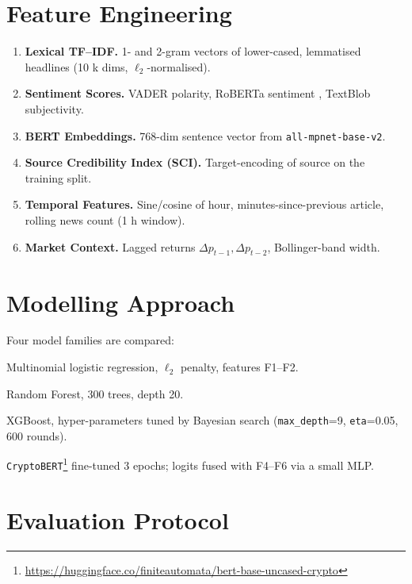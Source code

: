 \documentclass[12pt,a4paper]{article}
\begin{document}
\section{Feature Engineering}\label{sec:features}
\begin{enumerate}[label=\textbf{F\arabic*}.]
\item \textbf{Lexical TF–IDF.} 1- and 2-gram vectors of lower-cased,
      lemmatised headlines (10 k dims, $\ell_2$-normalised).
\item \textbf{Sentiment Scores.} VADER polarity, RoBERTa
      sentiment \cite{roberta}, TextBlob subjectivity.
\item \textbf{BERT Embeddings.} 768-dim sentence vector from
      \texttt{all-mpnet-base-v2}.
\item \textbf{Source Credibility Index (SCI).}
      Target-encoding of source on the training split.
\item \textbf{Temporal Features.} Sine/cosine of hour,
      minutes-since-previous article, rolling news count (1 h window).
\item \textbf{Market Context.} Lagged returns
      \(\Delta p_{t-1}, \Delta p_{t-2}\), Bollinger-band width.
\end{enumerate}

\section{Modelling Approach}
Four model families are compared:

\begin{description}[leftmargin=1.8cm,style=nextline]
\item[LogReg] Multinomial logistic regression, $\ell_2$ penalty,
             features F1–F2.
\item[RF] Random Forest, 300 trees, depth 20.
\item[XGB] XGBoost, hyper-parameters tuned by Bayesian search
           (\texttt{max\_depth}=9, \texttt{eta}=0.05, 600 rounds).
\item[BERT] \texttt{CryptoBERT}\footnote{\url{https://huggingface.co/finiteautomata/bert-base-uncased-crypto}}
           fine-tuned 3 epochs; logits fused with F4–F6 via a small MLP.
\end{description}

\section{Evaluation Protocol}
\end{document}
